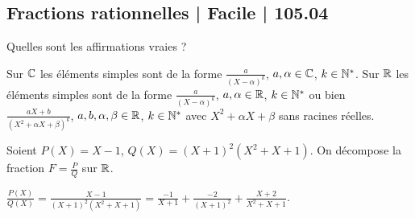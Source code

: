 \subsection{Fractions rationnelles | Facile | 105.04}

\begin{question}
Quelles sont les affirmations vraies ?
\begin{answers}



 
\end{answers}
\begin{explanations}
Sur $\mathbb{C}$ les éléments simples sont de la forme $\frac{a}{(X-\alpha)^k}$, $a,\alpha \in \mathbb{C}$, $k\in\mathbb{N}^*$.
Sur $\mathbb{R}$ les éléments simples sont de la forme $\frac{a}{(X-\alpha)^k}$, $a,\alpha \in \mathbb{R}$, $k \in \mathbb{N}^*$ ou bien
$\frac{aX+b}{(X^2+\alpha X+\beta)^k}$, $a,b,\alpha,\beta \in \mathbb{R}$, $k \in \mathbb{N}^*$ avec 
$X^2+\alpha X+\beta$ sans racines réelles.
\end{explanations}
\end{question}


\begin{question}
Soient $P(X)=X-1$, $Q(X)=(X+1)^2(X^2+X+1)$. On décompose la fraction $F = \frac{P}{Q}$ sur $\mathbb{R}$.
\begin{answers}
    
    
    
 
\end{answers}
\begin{explanations}
$\frac{P(X)}{Q(X)} = \frac{X-1}{(X+1)^2(X^2+X+1)}
= \frac{-1}{X+1}+\frac{-2}{(X+1)^2}+\frac{X+2}{X^2+X+1}$.
\end{explanations}
\end{question}



